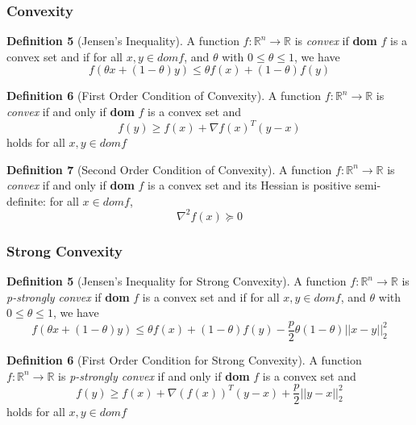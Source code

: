 \subsubsection{Convexity}
\noindent \textbf{Definition 5} (Jensen's Inequality). A function $f: \mathbb{R}^n \rightarrow \mathbb{R}$ is \textit{convex} if \textbf{dom} $f$ is a convex set and if for all $x, y \in dom f$, and $\theta$ with $0 \leq \theta \leq 1$, we have
\begin{equation}
    f(\theta x + (1 - \theta)y) \leq \theta f(x) + (1 - \theta) f(y)
\end{equation}

\noindent \textbf{Definition 6} (First Order Condition of Convexity). A function $f: \mathbb{R}^n \rightarrow \mathbb{R}$ is \textit{convex} if and only if \textbf{dom} $f$ is a convex set and 
\begin{equation}
    f(y) \geq f(x) + \nabla f(x)^T (y - x)
\end{equation}
holds for all $x, y \in dom f$

\noindent \textbf{Definition 7} (Second Order Condition of Convexity). A function $f: \mathbb{R}^n \rightarrow \mathbb{R}$ is \textit{convex} if and only if \textbf{dom} $f$ is a convex set and its Hessian is positive semi-definite: for all $x \in dom f$, 
\begin{equation}
    \nabla^2 f(x) \succeq 0
\end{equation}

\subsubsection{Strong Convexity}
\noindent \textbf{Definition 5} (Jensen's Inequality for Strong Convexity). A function $f: \mathbb{R}^n \rightarrow \mathbb{R}$ is \textit{p-strongly convex} if \textbf{dom} $f$ is a convex set and if for all $x, y \in dom f$, and $\theta$ with $0 \leq \theta \leq 1$, we have
\begin{equation}
    f(\theta x + (1 - \theta) y) \leq \theta f(x) + (1 - \theta) f(y) - \frac{p}{2} \theta (1 - \theta) ||x - y||^2_2
\end{equation}

\noindent \textbf{Definition 6} (First Order Condition for Strong Convexity). A function $f: \mathbb{R}^n \rightarrow \mathbb{R}$ is \textit{p-strongly convex} if and only if \textbf{dom} $f$ is a convex set and 
\begin{equation}
    f(y) \geq f(x) + \nabla(f(x))^T (y - x) + \frac{p}{2} ||y - x||^2_2
\end{equation}
holds for all $x, y \in dom f$

